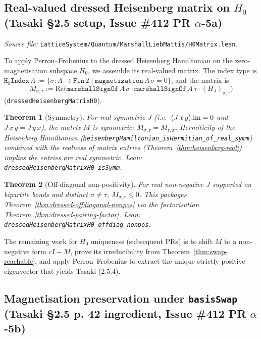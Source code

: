 \documentclass[a4paper,11pt]{article}
\newtheorem{theorem}{Theorem}
\begin{document}
\subsection{Real-valued dressed Heisenberg matrix on $H_0$ (Tasaki
§2.5 setup, Issue \#412 PR $\alpha$-5a)}
\label{ssec:mlm-h0-matrix}

\emph{Source file:}
\texttt{LatticeSystem/Quantum/MarshallLiebMattis/H0Matrix.lean}.

To apply Perron--Frobenius to the dressed Heisenberg Hamiltonian
on the zero-magnetisation subspace $H_0$, we assemble its
real-valued matrix. The index type is
$\texttt{H}_0\texttt{Index}\,\Lambda :=
 \{\sigma : \Lambda \to \texttt{Fin}\,2 \mid
   \texttt{magnetization}\,\Lambda\,\sigma = 0\}$, and the matrix is
\[
  M_{\sigma, \tau}
   := \mathrm{Re}\big(\texttt{marshallSignOf}\,A\,\sigma \cdot
                       \texttt{marshallSignOf}\,A\,\tau \cdot
                       (H_J)_{\sigma, \tau}\big)
\]
(\texttt{dressedHeisenbergMatrixH0}).

\begin{theorem}[Symmetry]
\label{thm:dressed-matrix-symm}
For real symmetric $J$ (i.e.\ $(J\,x\,y).{\rm im} = 0$ and
$J\,x\,y = J\,y\,x$), the matrix $M$ is symmetric:
$M_{\sigma, \tau} = M_{\tau, \sigma}$.
Hermiticity of the Heisenberg Hamiltonian
(\texttt{heisenbergHamiltonian\_isHermitian\_of\_real\_symm})
combined with the realness of matrix entries
(Theorem~\ref{thm:heisenberg-real}) implies the entries are
real symmetric. Lean:
\texttt{dressedHeisenbergMatrixH0\_isSymm}.
\end{theorem}

\begin{theorem}[Off-diagonal non-positivity]
\label{thm:dressed-matrix-offdiag}
For real non-negative $J$ supported on bipartite bonds and
distinct $\sigma \neq \tau$, $M_{\sigma, \tau} \le 0$.
This packages Theorem~\ref{thm:dressed-offdiagonal-nonpos} via
the factorisation
Theorem~\ref{thm:dressed-pairing-factor}. Lean:
\texttt{dressedHeisenbergMatrixH0\_offdiag\_nonpos}.
\end{theorem}

The remaining work for $H_0$ uniqueness (subsequent PRs) is to
shift $M$ to a non-negative form $cI - M$, prove its
irreducibility from Theorem~\ref{thm:swap-reachable}, and apply
Perron--Frobenius to extract the unique strictly positive
eigenvector that yields Tasaki (2.5.4).

\subsection{Magnetisation preservation under \texttt{basisSwap}
(Tasaki §2.5 p. 42 ingredient, Issue \#412 PR $\alpha$-5b)}
\label{ssec:mlm-magnetization-swap}
\end{document}
